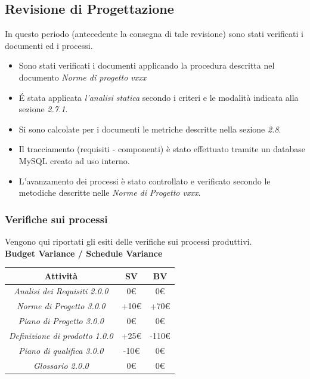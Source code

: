 {  \subsection{Revisione di Progettazione}
  In questo periodo (antecedente la consegna di tale revisione) sono stati verificati i documenti ed i processi.

  \begin{itemize}
  \item Sono stati verificati i documenti applicando la procedura descritta nel documento \emph{Norme di progetto vxxx}
  \item \'E stata applicata \emph{l'analisi statica} secondo i criteri e le modalità indicata alla sezione \emph{2.7.1}.
  \item Si sono calcolate per i documenti le metriche descritte nella sezione \emph{2.8}.
  \item Il tracciamento (requisiti - componenti) è stato effettuato tramite un database MySQL creato ad uso interno.
  \item L’avanzamento dei processi è stato controllato e verificato secondo le metodiche descritte nelle \emph{Norme di Progetto vxxx}.

  \end{itemize}
  \subsubsection{Verifiche sui processi}

  Vengono qui riportati gli esiti delle verifiche sui processi produttivi.\\


  \textbf{Budget Variance / Schedule Variance}

  \begin{center}
    \begin{tabular}{|c|c|c|}

      \hline
      \textbf{Attività} & \textbf{SV} & \textbf{BV} \\
      \hline
      \emph{Analisi dei Requisiti 2.0.0} & 0€ & 0€ \\
      \hline
      \emph{Norme di Progetto 3.0.0} & +10€ & +70€ \\
      \hline
      \emph{Piano di Progetto 3.0.0} & 0€ & 0€ \\
      \hline
      \emph{Definizione di prodotto 1.0.0} & +25€ & -110€ \\
      \hline
      \emph{Piano di qualifica 3.0.0} & -10€ & 0€ \\
      \hline
      \emph{Glossario 2.0.0} & 0€ & 0€ \\
      \hline
    \end{tabular}
  \end{center}

}

